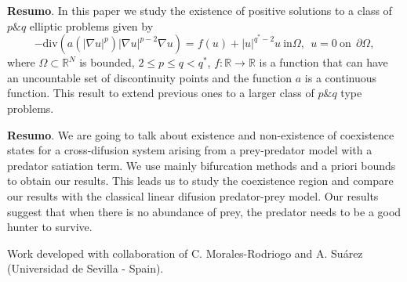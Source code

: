 
	
	
	\noindent\textbf{Resumo}.\label{rbn} 
	In this paper we study the existence of positive solutions to a class of  $p \& q$ elliptic problems given by
$$
-\mbox{div}(a(|\nabla u|^{p})|\nabla u|^{p-2}\nabla u)= f(u)+|u|^{q^{*}-2}u \ \mbox{in}\Omega,\ \  u=0\ \mbox{on} \ \ \partial\Omega,
$$
where  $\Omega\subset\mathbb{R}^{N}$ is bounded, $2 \leq p \leq q< q^{*}$, $f:\mathbb{R}\rightarrow \mathbb{R}$ is a function that can have an uncountable set of discontinuity points and the function $a$ is a continuous function. This result to extend previous ones to a larger class of $p\&q$ type problems.
	
	\vspace{24pt}

	
	
	\noindent\textbf{Resumo}.\label{wcs} 
	We are going to talk about existence and non-existence of coexistence states for a cross-difusion system arising from a prey-predator model with a predator satiation term. We use mainly bifurcation methods and a priori bounds to obtain our results. This leads us to study the coexistence region and compare our results with the classical linear difusion predator-prey model. Our results suggest that when there is no abundance of prey, the predator needs to be a good hunter to survive.
	
	\vspace*{0.5cm} \noindent Work developed with collaboration of C. Morales-Rodriogo and A. Suárez (Universidad de Sevilla - Spain).
	
	\vspace{24pt}



\clearpage	